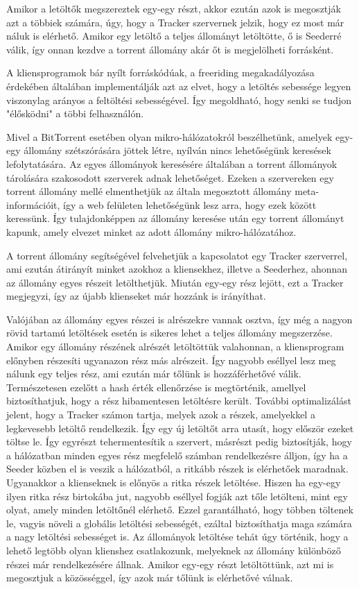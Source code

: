 \documentclass[a4paper]{article}
\begin{document}
Amikor a letöltők megszereztek egy-egy részt, akkor ezután azok is megosztják azt a többiek számára, úgy, hogy a
Tracker szervernek jelzik, hogy ez most már náluk is elérhető. Amikor egy letöltő a teljes állományt letöltötte, ő is
Seederré válik, így onnan kezdve a torrent állomány akár őt is megjelölheti forrásként.

A kliensprogramok bár nyílt forráskódúak, a freeriding megakadályozása érdekében általában implementálják azt az elvet,
hogy a letöltés sebessége legyen viszonylag arányos a feltöltési sebességével. Így megoldható, hogy senki se tudjon
"élősködni" a többi felhasználón.

Mivel a BitTorrent esetében olyan mikro-hálózatokról beszélhetünk, amelyek egy-egy állomány szétszórására jöttek létre,
nyílván nincs lehetőségünk keresések lefolytatására. Az egyes állományok keresésére általában a torrent állományok
tárolására szakosodott szerverek adnak lehetőséget. Ezeken a szervereken egy torrent állomány mellé elmenthetjük az
általa megosztott állomány meta-információit, így a web felületen lehetőségünk lesz arra, hogy ezek között keressünk.
Így tulajdonképpen az állomány keresése után egy torrent állományt kapunk, amely elvezet minket az adott állomány
mikro-hálózatához.

A torrent állomány segítségével felvehetjük a kapcsolatot egy Tracker szerverrel, ami ezután átirányít minket azokhoz a
kliensekhez, illetve a Seederhez, ahonnan az állomány egyes részeit letölthetjük. Miután egy-egy rész lejött, ezt a
Tracker megjegyzi, így az újabb klienseket már hozzánk is irányíthat.

Valójában az állomány egyes részei is alrészekre vannak osztva, így még a nagyon rövid tartamú letöltések esetén is
sikeres lehet a teljes állomány megszerzése. Amikor egy állomány részének alrészét letöltöttük valahonnan, a
kliensprogram előnyben részesíti ugyanazon rész más alrészeit. Így nagyobb eséllyel lesz meg nálunk egy teljes rész,
ami ezután már tőlünk is hozzáférhetővé válik. Természetesen ezelőtt a hash érték ellenőrzése is megtörténik, amellyel
biztosíthatjuk, hogy a rész hibamentesen letöltésre került. További optimalizálást jelent, hogy a Tracker számon
tartja, melyek azok a részek, amelyekkel a legkevesebb letöltő rendelkezik. Így egy új letöltőt arra utasít, hogy
először ezeket töltse le. Így egyrészt tehermentesítik a szervert, másrészt pedig biztosítják, hogy a hálózatban minden
egyes rész megfelelő számban rendelkezésre álljon, így ha a Seeder közben el is veszik a hálózatból, a ritkább részek
is elérhetőek maradnak. Ugyanakkor a klienseknek is előnyös a ritka részek letöltése. Hiszen ha egy-egy ilyen ritka
rész birtokába jut, nagyobb eséllyel fogják azt tőle letölteni, mint egy olyat, amely minden letöltőnél elérhető. Ezzel
garantálható, hogy többen töltenek le, vagyis növeli a globális letöltési sebességét, ezáltal biztosíthatja maga
számára a nagy letöltési sebességet is. Az állományok letöltése tehát úgy történik, hogy a lehető legtöbb olyan
klienshez csatlakozunk, melyeknek az állomány különböző részei már rendelkezésére állnak. Amikor egy-egy részt
letöltöttünk, azt mi is megosztjuk a közösséggel, így azok már tőlünk is elérhetővé válnak.
\end{document}
